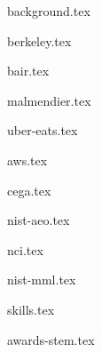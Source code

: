 \documentclass[11pt]{article}
\begin{document}
{background.tex}


{berkeley.tex}


{bair.tex}

{malmendier.tex}

{uber-eats.tex}

{aws.tex}

{cega.tex}

{nist-aeo.tex}

{nci.tex}


{nist-mml.tex}


{skills.tex}


{awards-stem.tex}
\end{document}
